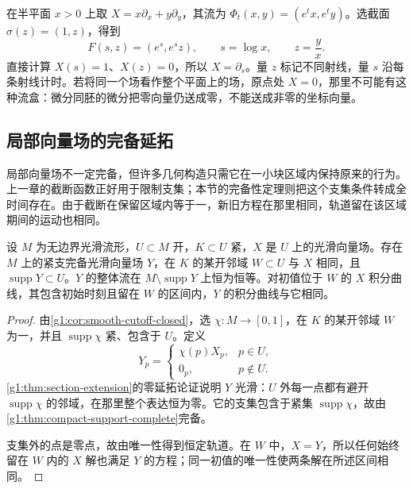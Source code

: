 \begin{example}
	\label{g1:exm:radial-flow-box}
	在半平面 \(x>0\) 上取 \(X=x\partial_x+y\partial_y\)，其流为 \(\Phi_t(x,y)=(e^t x,e^t y)\)。选截面 \(\sigma(z)=(1,z)\)，得到
	\[
		F(s,z)=(e^s,e^s z),\qquad s=\log x,\qquad z=\frac yx.
	\]
	直接计算 \(X(s)=1\)、\(X(z)=0\)，所以 \(X=\partial_s\)。量 \(z\) 标记不同射线，量 \(s\) 沿每条射线计时。若将同一个场看作整个平面上的场，原点处 \(X=0\)，那里不可能有这种流盒：微分同胚的微分把零向量仍送成零，不能送成非零的坐标向量。
\end{example}

\subsection{局部向量场的完备延拓}
\label{g1:subsec:1302:04}

局部向量场不一定完备，但许多几何构造只需它在一小块区域内保持原来的行为。上一章的截断函数正好用于限制支集；本节的完备性定理则把这个支集条件转成全时间存在。由于截断在保留区域内等于一，新旧方程在那里相同，轨道留在该区域期间的运动也相同。

\begin{proposition}
	\label{g1:prop:complete-local-extension}
	设 \(M\) 为无边界光滑流形，\(U\subset M\) 开，\(K\subset U\) 紧，\(X\) 是 \(U\) 上的光滑向量场。存在 \(M\) 上的紧支完备光滑向量场 \(Y\)，在 \(K\) 的某开邻域 \(W\subset U\) 与 \(X\) 相同，且 \(\operatorname{supp}Y\subset U\)。\(Y\) 的整体流在 \(M\setminus\operatorname{supp}Y\) 上恒为恒等。对初值位于 \(W\) 的 \(X\) 积分曲线，其包含初始时刻且留在 \(W\) 的区间内，\(Y\) 的积分曲线与它相同。
\end{proposition}
\begin{proof}
	由\cref{g1:cor:smooth-cutoff-closed}，选 \(\chi:M\to[0,1]\)，在 \(K\) 的某开邻域 \(W\) 为一，并且 \(\operatorname{supp}\chi\) 紧、包含于 \(U\)。定义
	\[
		Y_p=
		\begin{cases}
			\chi(p)X_p,&p\in U,\\
			0_p,&p\notin U.
		\end{cases}
	\]
	\cref{g1:thm:section-extension}的零延拓论证说明 \(Y\) 光滑：\(U\) 外每一点都有避开 \(\operatorname{supp}\chi\) 的邻域，在那里整个表达恒为零。它的支集包含于紧集 \(\operatorname{supp}\chi\)，故由\cref{g1:thm:compact-support-complete}完备。

	支集外的点是零点，故由唯一性得到恒定轨道。在 \(W\) 中，\(X=Y\)，所以任何始终留在 \(W\) 内的 \(X\) 解也满足 \(Y\) 的方程；同一初值的唯一性使两条解在所述区间相同。
\end{proof}

